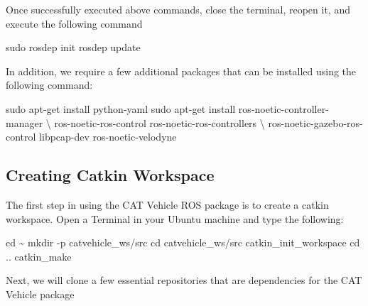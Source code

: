 \documentclass[
]{article}
\newenvironment{Shaded}{\begin{snugshade}}{\end{snugshade}}
\newcommand{\AttributeTok}[1]{\textcolor[rgb]{0.77,0.63,0.00}{#1}}
\newcommand{\BuiltInTok}[1]{#1}
\newcommand{\DataTypeTok}[1]{\textcolor[rgb]{0.13,0.29,0.53}{#1}}
\newcommand{\ExtensionTok}[1]{#1}
\newcommand{\FunctionTok}[1]{\textcolor[rgb]{0.00,0.00,0.00}{#1}}
\newcommand{\NormalTok}[1]{#1}
\begin{document}
Once successfully executed above commands, close the terminal, reopen
it, and execute the following command

\begin{Shaded}
\begin{Highlighting}[]
\FunctionTok{sudo}\NormalTok{ rosdep init}
\ExtensionTok{rosdep}\NormalTok{ update}
\end{Highlighting}
\end{Shaded}

In addition, we require a few additional packages that can be installed
using the following command:

\begin{Shaded}
\begin{Highlighting}[]
\FunctionTok{sudo}\NormalTok{ apt{-}get install python{-}yaml}
\FunctionTok{sudo}\NormalTok{ apt{-}get install ros{-}noetic{-}controller{-}manager }\DataTypeTok{\textbackslash{} }
\ExtensionTok{ros{-}noetic{-}ros{-}control}\NormalTok{ ros{-}noetic{-}ros{-}controllers }\DataTypeTok{\textbackslash{} }
\ExtensionTok{ros{-}noetic{-}gazebo{-}ros{-}control}\NormalTok{ libpcap{-}dev ros{-}noetic{-}velodyne}
\end{Highlighting}
\end{Shaded}

\hypertarget{creating-catkin-workspace}{%
\subsection{Creating Catkin Workspace}\label{creating-catkin-workspace}}

The first step in using the CAT Vehicle ROS package is to create a
catkin workspace. Open a Terminal in your Ubuntu machine and type the
following:

\begin{Shaded}
\begin{Highlighting}[]
\BuiltInTok{cd}\NormalTok{ \textasciitilde{}}
\FunctionTok{mkdir} \AttributeTok{{-}p}\NormalTok{ catvehicle\_ws/src}
\BuiltInTok{cd}\NormalTok{ catvehicle\_ws/src}
\ExtensionTok{catkin\_init\_workspace}
\BuiltInTok{cd}\NormalTok{ ..}
\ExtensionTok{catkin\_make}
\end{Highlighting}
\end{Shaded}

Next, we will clone a few essential repositories that are dependencies
for the CAT Vehicle package
\end{document}
